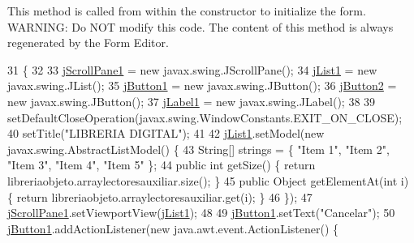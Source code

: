 This method is called from within the constructor to initialize the form. W\+A\+R\+N\+I\+NG\+: Do N\+OT modify this code. The content of this method is always regenerated by the Form Editor. 
\begin{DoxyCode}
31                                   \{
32 
33         \mbox{\hyperlink{class_interfaz_package_1_1_consulta_lista_lectores_a787ac57dc3272376d42c09c0c7f1ef71}{jScrollPane1}} = \textcolor{keyword}{new} javax.swing.JScrollPane();
34         \mbox{\hyperlink{class_interfaz_package_1_1_consulta_lista_lectores_adfbed0d9d2c73d12354e8e7d39d3d074}{jList1}} = \textcolor{keyword}{new} javax.swing.JList();
35         \mbox{\hyperlink{class_interfaz_package_1_1_consulta_lista_lectores_a682904c76af705735a4b6c2b4ae04c86}{jButton1}} = \textcolor{keyword}{new} javax.swing.JButton();
36         \mbox{\hyperlink{class_interfaz_package_1_1_consulta_lista_lectores_a7f8eecc27df6bdc9fc291b6e6c83dc61}{jButton2}} = \textcolor{keyword}{new} javax.swing.JButton();
37         \mbox{\hyperlink{class_interfaz_package_1_1_consulta_lista_lectores_a527df4a58dc048d5d173177fa32f0764}{jLabel1}} = \textcolor{keyword}{new} javax.swing.JLabel();
38 
39         setDefaultCloseOperation(javax.swing.WindowConstants.EXIT\_ON\_CLOSE);
40         setTitle(\textcolor{stringliteral}{"LIBRERIA DIGITAL"});
41 
42         \mbox{\hyperlink{class_interfaz_package_1_1_consulta_lista_lectores_adfbed0d9d2c73d12354e8e7d39d3d074}{jList1}}.setModel(\textcolor{keyword}{new} javax.swing.AbstractListModel() \{
43             String[] strings = \{ \textcolor{stringliteral}{"Item 1"}, \textcolor{stringliteral}{"Item 2"}, \textcolor{stringliteral}{"Item 3"}, \textcolor{stringliteral}{"Item 4"}, \textcolor{stringliteral}{"Item 5"} \};
44             \textcolor{keyword}{public} \textcolor{keywordtype}{int} getSize() \{ \textcolor{keywordflow}{return} libreriaobjeto.arraylectoresauxiliar.size(); \}
45             \textcolor{keyword}{public} Object getElementAt(\textcolor{keywordtype}{int} i) \{ \textcolor{keywordflow}{return} libreriaobjeto.arraylectoresauxiliar.get(i); \}
46         \});
47         \mbox{\hyperlink{class_interfaz_package_1_1_consulta_lista_lectores_a787ac57dc3272376d42c09c0c7f1ef71}{jScrollPane1}}.setViewportView(\mbox{\hyperlink{class_interfaz_package_1_1_consulta_lista_lectores_adfbed0d9d2c73d12354e8e7d39d3d074}{jList1}});
48 
49         \mbox{\hyperlink{class_interfaz_package_1_1_consulta_lista_lectores_a682904c76af705735a4b6c2b4ae04c86}{jButton1}}.setText(\textcolor{stringliteral}{"Cancelar"});
50         \mbox{\hyperlink{class_interfaz_package_1_1_consulta_lista_lectores_a682904c76af705735a4b6c2b4ae04c86}{jButton1}}.addActionListener(\textcolor{keyword}{new} java.awt.event.ActionListener() \{

\end{DoxyCode}
